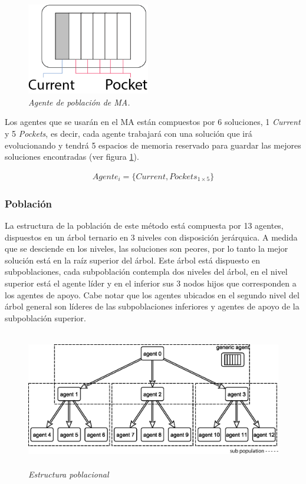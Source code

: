 \begin{figure}[H]
	\centering
	\includegraphics[height=4cm]{images/agent.png}
	\caption{\em Agente de población de MA.}
	\label{fig:agent}
\end{figure}

Los agentes que se usarán en el MA están compuestos por 6 soluciones, 1 \textit{Current} y 5 \textit{Pockets}, es decir, cada agente trabajará con una solución que irá evolucionando y tendrá 5 espacios de memoria reservado para guardar las mejores soluciones encontradas (ver figura \ref{fig:agent}).

\begin{equation*} 
    \begin{split} 
        Agente_i = \{Current, Pockets_{1{\times}5}\}
    \end{split} 
\end{equation*}


\subsubsection{Población}
\label{diseno:poblacion}
La estructura de la población de este método está compuesta por 13 agentes, dispuestos en un árbol ternario en 3 niveles con disposición jerárquica. A medida que se desciende en los niveles, las soluciones son peores, por lo tanto la mejor solución está en la raíz superior del árbol.
Este árbol está dispuesto en subpoblaciones, cada subpoblación contempla dos niveles del árbol, en el nivel superior está el agente líder y en el inferior sus 3 nodos hijos que corresponden a los agentes de apoyo. Cabe notar que los agentes ubicados en el segundo nivel del árbol general son líderes de las subpoblaciones inferiores y agentes de apoyo de la subpoblación superior.

\begin{figure}[tp]
	\centering
	\includegraphics[height=6cm]{images/popStructure.eps}
	\caption{\em Estructura poblacional}
	\label{fig:ternary-pop}
\end{figure}

